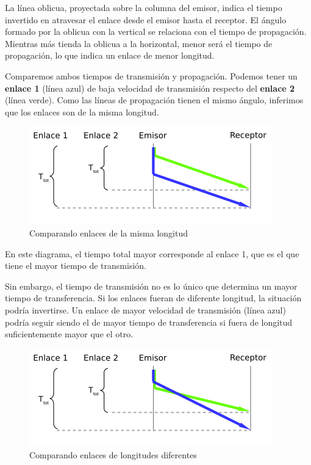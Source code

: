 \documentclass[spanish,a4paper,]{article}
\begin{document}
La línea oblicua, proyectada sobre la columna del emisor, indica el
tiempo invertido en atravesar el enlace desde el emisor hasta el
receptor. El ángulo formado por la oblicua con la vertical se relaciona
con el tiempo de propagación. Mientras más tienda la oblicua a la
horizontal, menor será el tiempo de propagación, lo que indica un enlace
de menor longitud.

Comparemos ambos tiempos de transmisión y propagación. Podemos tener un
\textbf{enlace 1} (línea azul) de baja velocidad de transmisión respecto
del \textbf{enlace 2} (línea verde). Como las líneas de propagación
tienen el mismo ángulo, inferimos que los enlaces son de la misma
longitud.

\begin{figure}
\centering
\includegraphics{img/enlaces-1.png}
\caption{Comparando enlaces de la misma longitud}
\end{figure}

En este diagrama, el tiempo total mayor corresponde al enlace 1, que es
el que tiene el mayor tiempo de transmisión.

Sin embargo, el tiempo de transmisión no es lo único que determina un
mayor tiempo de transferencia. Si los enlaces fueran de diferente
longitud, la situación podría invertirse. Un enlace de mayor velocidad
de transmisión (línea azul) podría seguir siendo el de mayor tiempo de
transferencia si fuera de longitud suficientemente mayor que el otro.

\begin{figure}
\centering
\includegraphics{img/enlaces-2.png}
\caption{Comparando enlaces de longitudes diferentes}
\end{figure}
\end{document}
